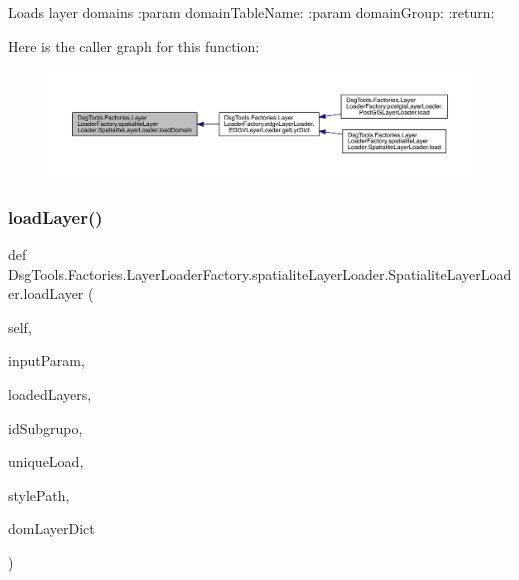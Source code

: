 \begin{DoxyVerb}Loads layer domains
:param domainTableName:
:param domainGroup:
:return:
\end{DoxyVerb}
 Here is the caller graph for this function\+:
\nopagebreak
\begin{figure}[H]
\begin{center}
\leavevmode
\includegraphics[width=350pt]{class_dsg_tools_1_1_factories_1_1_layer_loader_factory_1_1spatialite_layer_loader_1_1_spatialite_layer_loader_a8ad35427b9daaa2a7a44e3e8fd7fdd73_icgraph}
\end{center}
\end{figure}
\mbox{\label{class_dsg_tools_1_1_factories_1_1_layer_loader_factory_1_1spatialite_layer_loader_1_1_spatialite_layer_loader_a56968bee64a3c937eea1bf57ab66bee1}} 
\subsubsection{\texorpdfstring{load\+Layer()}{loadLayer()}}
{\footnotesize\ttfamily def Dsg\+Tools.\+Factories.\+Layer\+Loader\+Factory.\+spatialite\+Layer\+Loader.\+Spatialite\+Layer\+Loader.\+load\+Layer (\begin{DoxyParamCaption}\item[{}]{self,  }\item[{}]{input\+Param,  }\item[{}]{loaded\+Layers,  }\item[{}]{id\+Subgrupo,  }\item[{}]{unique\+Load,  }\item[{}]{style\+Path,  }\item[{}]{dom\+Layer\+Dict }\end{DoxyParamCaption})}

